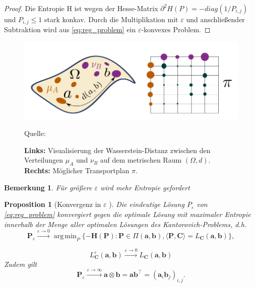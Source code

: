 \documentclass[twoside, 12pt,a4paper]{book}
\newcommand{\source}[1]{\caption*{\hfill Quelle: {#1}} }
\DeclareMathOperator*{\argmin}{arg\,min}
\newtheorem{proposition}[theorem]{Proposition}
\newtheorem{remark}[theorem]{Bemerkung}
\numberwithin{equation}{section}
\begin{document}
	
	\begin{proof}
		Die Entropie H ist wegen der Hesse-Matrix $\partial ^2 H (P) = -diag(1/P_{i,j})$ und $P_{i,j} \leq 1$ stark konkav.
		Durch die Multiplikation mit $\varepsilon$ und anschließender Subtraktion wird aus \eqref{eq:reg_problem} ein $\varepsilon$-konvexes Problem. 
	\end{proof}
	
	\begin{figure}[!ht]
		\centering
		\includegraphics[width=0.3\textheight]{wd_Transportplan.png}
		\caption[Visualisierung der Wasserstein-Distanz und Transportplan]{\textbf{Links:} Visualisierung der Wasserstein-Distanz zwischen den Verteilungen $\mu_A$ und $\nu_B$ auf dem metrischen Raum $(\Omega,d)$. \textbf{Rechts:} Möglicher Transportplan $\pi$.}
		\source{\cite{vialard2019elementary}}
		\label{im:wasserstein_distance_visualization}
	\end{figure}
	
	
	
	
	\begin{remark}
		Für größere $\varepsilon$ wird mehr Entropie gefordert
	\end{remark}
	
	\begin{proposition}[Konvergenz in $\varepsilon$ \cite{COTcuturi}]
		Die eindeutige Lösung $P_\varepsilon$ von \eqref{eq:reg_problem} konvergiert gegen die optimale Lösung mit maximaler Entropie innerhalb der Menge aller optimalen Lösungen des Kan\-to\-ro\-vich-Pro\-blems, d.h.
		\begin{equation}
		\boldsymbol{P}_\varepsilon \xrightarrow{\varepsilon \to 0} \argmin_{P} \lbrace -\boldsymbol{H}(\boldsymbol{P}) : \boldsymbol{P} \in \Pi (\boldsymbol{a}, \boldsymbol{b}), \langle \boldsymbol{P}, \boldsymbol{C} \rangle = L_{\boldsymbol{C}}(\boldsymbol{a}, \boldsymbol{b}) \rbrace, \label{eq:P_eps_0} 
		\end{equation}
		
		
		\begin{equation}
		L_{\boldsymbol{C}}^\varepsilon (\boldsymbol{a}, \boldsymbol{b}) \xrightarrow{\varepsilon \to 0} L_{\boldsymbol{C}}(\boldsymbol{a}, \boldsymbol{b})
		\end{equation}
		Zudem gilt
		\begin{equation}
		\boldsymbol{P}_\varepsilon \xrightarrow{\varepsilon \to \infty} \boldsymbol{a} \otimes \boldsymbol{b} = \boldsymbol{a} \boldsymbol{b}^\top = (\boldsymbol{a}_i \boldsymbol{b}_j)_{i,j}. \label{eq:P_eps_infty}
		\end{equation}
	\end{proposition}
	
\end{document}
